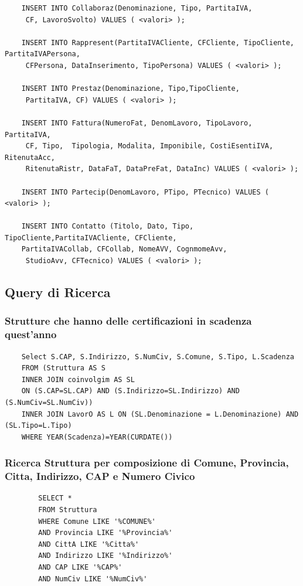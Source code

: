 \documentclass{elegantbook}
\begin{document}
\begin{verbatim}
	INSERT INTO Collaboraz(Denominazione, Tipo, PartitaIVA,
	 CF, LavoroSvolto) VALUES ( <valori> );
	 
	INSERT INTO Rappresent(PartitaIVACliente, CFCliente, TipoCliente, PartitaIVAPersona,
	 CFPersona, DataInserimento, TipoPersona) VALUES ( <valori> );
	 
	INSERT INTO Prestaz(Denominazione, Tipo,TipoCliente,
	 PartitaIVA, CF) VALUES ( <valori> );
	 
	INSERT INTO Fattura(NumeroFat, DenomLavoro, TipoLavoro, PartitaIVA,
	 CF, Tipo,  Tipologia, Modalita, Imponibile, CostiEsentiIVA, RitenutaAcc, 
	 RitenutaRistr, DataFaT, DataPreFat, DataInc) VALUES ( <valori> );
	 
	INSERT INTO Partecip(DenomLavoro, PTipo, PTecnico) VALUES ( <valori> );
	
	INSERT INTO Contatto (Titolo, Dato, Tipo, TipoCliente,PartitaIVACliente, CFCliente, 
	PartitaIVACollab, CFCollab, NomeAVV, CognmomeAvv,
	 StudioAvv, CFTecnico) VALUES ( <valori> );
\end{verbatim}
\newpage
\subsection{Query di Ricerca}
\subsubsection{Strutture che hanno delle certificazioni in scadenza quest'anno}
\begin{verbatim}
	Select S.CAP, S.Indirizzo, S.NumCiv, S.Comune, S.Tipo, L.Scadenza
	FROM (Struttura AS S 
	INNER JOIN coinvolgim AS SL 
	ON (S.CAP=SL.CAP) AND (S.Indirizzo=SL.Indirizzo) AND (S.NumCiv=SL.NumCiv))
	INNER JOIN LavorO AS L ON (SL.Denominazione = L.Denominazione) AND (SL.Tipo=L.Tipo)
	WHERE YEAR(Scadenza)=YEAR(CURDATE())
\end{verbatim}
\begin{figure}[H]
	\centering
\end{figure}
\subsubsection{Ricerca Struttura per composizione di Comune, Provincia, Citta, Indirizzo, CAP e Numero Civico}
	\begin{verbatim}
		SELECT *
		FROM Struttura
		WHERE Comune LIKE '%COMUNE%' 
		AND Provincia LIKE '%Provincia%'
		AND CittA LIKE '%Citta%'
		AND Indirizzo LIKE '%Indirizzo%'
		AND CAP LIKE '%CAP%'
		AND NumCiv LIKE '%NumCiv%'
	\end{verbatim}
\end{document}

